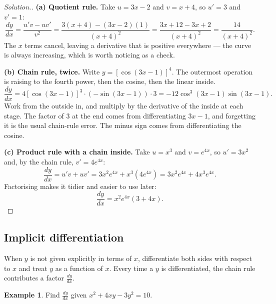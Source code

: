 \documentclass[11pt,a4paper]{article}
\theoremstyle{definition}
\newtheorem{example}[thm]{Example}
\newenvironment{solution}
  {\renewcommand{\qedsymbol}{}\begin{proof}[\textit{Solution}.]}
  {\end{proof}}
\begin{document}
\begin{solution}
\textbf{(a) Quotient rule.} Take $u=3x-2$ and $v=x+4$, so $u'=3$ and $v'=1$:
$$\frac{dy}{dx}=\frac{u'v-uv'}{v^2}=\frac{3(x+4)-(3x-2)(1)}{(x+4)^2}
=\frac{3x+12-3x+2}{(x+4)^2}=\frac{14}{(x+4)^2}.$$
The $x$ terms cancel, leaving a derivative that is positive everywhere --- the curve
is always increasing, which is worth noticing as a check.

\textbf{(b) Chain rule, twice.} Write $y=\left[\cos(3x-1)\right]^4$. The outermost
operation is raising to the fourth power, then the cosine, then the linear inside.
$$\frac{dy}{dx}=4\left[\cos(3x-1)\right]^3\cdot\left(-\sin(3x-1)\right)\cdot 3
=-12\cos^3(3x-1)\sin(3x-1).$$
Work from the outside in, and multiply by the derivative of the inside at each stage.
The factor of $3$ at the end comes from differentiating $3x-1$, and forgetting it is the
usual chain-rule error. The minus sign comes from differentiating the cosine.

\textbf{(c) Product rule with a chain inside.} Take $u=x^3$ and $v=e^{4x}$, so
$u'=3x^2$ and, by the chain rule, $v'=4e^{4x}$:
$$\frac{dy}{dx}=u'v+uv'=3x^2e^{4x}+x^3\left(4e^{4x}\right)
=3x^2e^{4x}+4x^3e^{4x}.$$
Factorising makes it tidier and easier to use later:
$$\frac{dy}{dx}=x^2e^{4x}\left(3+4x\right).$$
\end{solution}

\subsection{Implicit differentiation}

When $y$ is not given explicitly in terms of $x$, differentiate both sides with respect
to $x$ and treat $y$ as a function of $x$. Every time a $y$ is differentiated, the chain
rule contributes a factor $\frac{dy}{dx}$.

\begin{example}
Find $\frac{dy}{dx}$ given $x^2+4xy-3y^2=10$.
\end{example}
\end{document}
